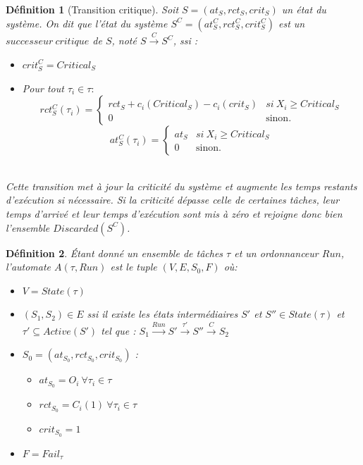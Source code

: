 \documentclass[a4paper]{report}
\theoremstyle{break}
\newtheorem{defin}{Définition}
\theoremstyle{breakplain}
\begin{document}
\begin{defin}[Transition critique]
Soit $S = (at_S, rct_S, crit_S)$ un état du système. On dit que l'état du système $S^C = (at_S^C, rct_S^C, crit_S^C)$ est un $successeur\ critique$ de $S$, noté $S\xrightarrow{C}S^C$, ssi :
\begin{itemize}
\item $crit_S^C = Critical_S$
\item Pour tout $\tau_i \in \tau :$
$$ rct_S^C(\tau_i) = \left\{
    \begin{array}{ll}
        rct_S+c_i(Critical_S)-c_i(crit_S) & si\ X_i\geq Critical_S \\
        0 & \mbox{sinon.}
    \end{array}
\right.
$$
$$ at_S^C(\tau_i) = \left\{
    \begin{array}{ll}
        at_S & si\ X_i\geq Critical_S \\
        0 & \mbox{sinon.}
    \end{array}
\right.
$$\\
\end{itemize}
Cette transition met à jour la criticité du système et augmente les temps restants d'exécution si nécessaire. Si la criticité dépasse celle de certaines tâches, leur temps d'arrivé et leur temps d'exécution sont mis à zéro et rejoigne donc bien l'ensemble $Discarded(S^C)$.
\end{defin}

\begin{defin} Étant donné un ensemble de tâches $\tau$ et un ordonnanceur $Run$, l'automate $A(\tau,Run)$ est le tuple $(V, E, S_0, F)$ où:
\begin{itemize}
\item  $V=State(\tau)$
\item $(S_1,S_2) \in E$ ssi il existe les états intermédiaires $S'$ et $S'' \in State(\tau)$ et $\tau' \subseteq Active(S') $ tel que : $S_1\xrightarrow{Run}S'\xrightarrow{\tau'}S''\xrightarrow{C}S_2$
\item $S_0 = (at_{S_0}, rct_{S_0}, crit_{S_0})$ :\begin{itemize}
\item $at_{S_0} = O_i\ \forall \tau_i \in \tau$
\item $rct_{S_0} = C_i(1)\ \forall \tau_i \in \tau$
\item $crit_{S_0} = 1$
\end{itemize}
\item $F = Fail_\tau$
\end{itemize}

\end{defin} 
\end{document}
